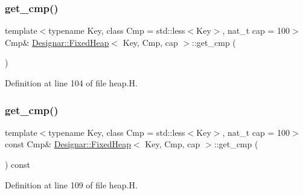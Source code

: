 \subsubsection{\texorpdfstring{get\+\_\+cmp()}{get\_cmp()}\hspace{0.1cm}{\footnotesize\ttfamily [1/2]}}
{\footnotesize\ttfamily template$<$typename Key, class Cmp = std\+::less$<$\+Key$>$, nat\+\_\+t cap = 100$>$ \\
Cmp\& \hyperlink{class_designar_1_1_fixed_heap}{Designar\+::\+Fixed\+Heap}$<$ Key, Cmp, cap $>$\+::get\+\_\+cmp (\begin{DoxyParamCaption}{ }\end{DoxyParamCaption})\hspace{0.3cm}{\ttfamily [inline]}}



Definition at line 104 of file heap.\+H.

\mbox{\label{class_designar_1_1_fixed_heap_a88f1060c9630d0c8e56fd58370b9a875}} 
\subsubsection{\texorpdfstring{get\+\_\+cmp()}{get\_cmp()}\hspace{0.1cm}{\footnotesize\ttfamily [2/2]}}
{\footnotesize\ttfamily template$<$typename Key, class Cmp = std\+::less$<$\+Key$>$, nat\+\_\+t cap = 100$>$ \\
const Cmp\& \hyperlink{class_designar_1_1_fixed_heap}{Designar\+::\+Fixed\+Heap}$<$ Key, Cmp, cap $>$\+::get\+\_\+cmp (\begin{DoxyParamCaption}{ }\end{DoxyParamCaption}) const\hspace{0.3cm}{\ttfamily [inline]}}



Definition at line 109 of file heap.\+H.

\mbox{\label{class_designar_1_1_fixed_heap_a00227ce55200154dac2fcfb42026e353}} 
